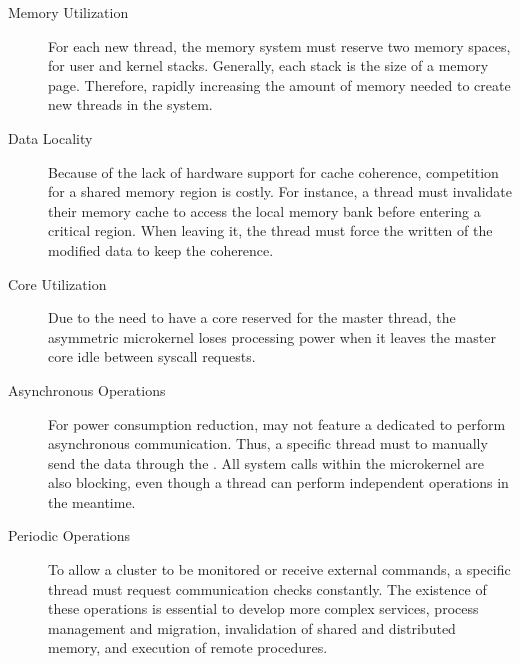 	\begin{description}
		\item[Memory Utilization] For each new thread, the memory
			system must reserve two memory spaces, for user and kernel stacks.
			Generally, each stack is the size of a memory page. Therefore,
			rapidly increasing the amount of memory needed to create new
			threads in the system.

		\item[Data Locality] Because of the lack of hardware support for cache
			coherence, competition for a shared memory region is costly. For
			instance, a thread must invalidate their memory cache to access the
			local memory bank before entering a critical region. When leaving
			it, the thread must force the written of the modified data to keep
			the coherence.

		\item[Core Utilization] Due to the need to have a core reserved for the
			master thread, the asymmetric microkernel loses processing power
			when it leaves the master core idle between syscall requests.

		\item[Asynchronous Operations] For power consumption reduction, \lws may
			not feature a dedicated \dma to perform asynchronous communication.
			Thus, a specific thread must to manually send the data through the
			\noc. All system calls within the microkernel are also blocking,
			even though a thread can perform independent operations in the
			meantime.

		\item[Periodic Operations] To allow a cluster to be monitored or
			receive external commands, a specific thread must request
			communication checks constantly. The existence of these operations
			is essential to develop more complex services, \eg process
			management and migration, invalidation of shared and distributed
			memory, and execution of remote procedures.
	\end{description}

